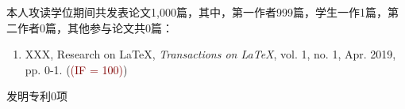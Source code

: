 \begin{publication}
\newcommand{\IF}[1]{\textcolor{Maroon}{(IF = #1)}}
本人攻读学位期间共发表论文1,000篇，其中，第一作者999篇，学生一作1篇，第二作者0篇，其他参与论文共0篇：
\begin{enumerate}
\item XXX, Research on \LaTeX, \emph{Transactions on \LaTeX}, vol. 1, no. 1, Apr. 2019, pp. 0-1. (\IF{100})
\end{enumerate}

发明专利0项


\end{publication}
